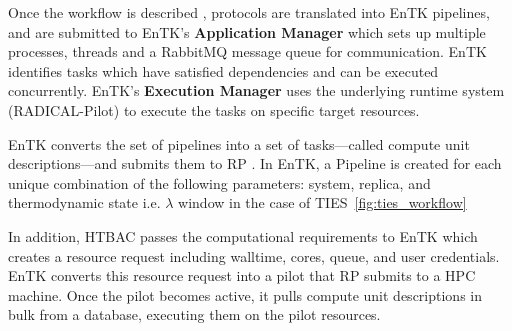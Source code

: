 



Once the workflow is described , protocols are translated
into EnTK pipelines, and are submitted to EnTK's \textbf{Application Manager}
which sets up multiple processes, threads and a RabbitMQ message queue for
communication. EnTK identifies tasks which have satisfied dependencies and
can be executed concurrently. EnTK's \textbf{Execution Manager} uses the
underlying runtime system (RADICAL-Pilot) to execute the tasks on specific
target resources.

EnTK converts the set of pipelines into a set of tasks---called compute unit
descriptions---and submits them to RP . In EnTK, a
Pipeline is created for each unique combination of the following parameters:
system, replica, and thermodynamic state i.e. $\lambda$ window in the case of
TIES~\ref{fig:ties_workflow} 

In addition, HTBAC passes the computational requirements  to
EnTK which creates a resource request including walltime, cores, queue, and
user credentials. EnTK converts this resource request into a pilot that RP
submits to a HPC machine. Once the pilot becomes active, it pulls compute
unit descriptions in bulk from a database, executing them on the pilot
resources.

